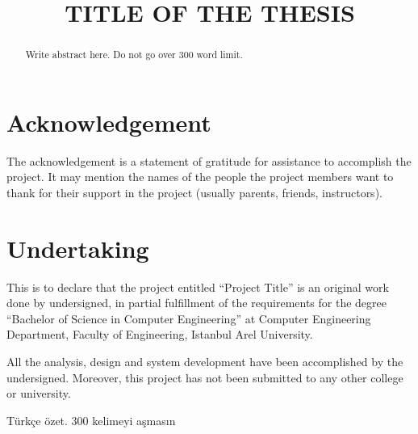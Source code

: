 \documentclass[12pt]{report}
\title{TITLE OF THE THESIS}
\begin{document}
\maketitle


\begin{preliminary}
	
	\chapter*{Acknowledgement}

	The acknowledgement is a statement of gratitude for assistance to accomplish the project. It may mention the names of the people the project members want to thank for their support in the project (usually parents, friends, instructors).


	\chapter*{Undertaking}
	This is to declare that the project entitled “Project Title” is an original work done by undersigned, in partial fulfillment of the requirements for the degree “Bachelor of Science in Computer Engineering” at Computer Engineering Department, Faculty of Engineering, Istanbul Arel University.

	
	All the analysis, design and system development have been accomplished by the undersigned. Moreover, this project has not been submitted to any other college or university.
	
	
\newpage
\begin{abstract}
	Write abstract here. Do not go over 300 word limit.
\end{abstract}


\begin{ozet}
	Türkçe özet. 300 kelimeyi aşmasın
\end{ozet}

\tableofcontents

\listoffigures
{}%

\listoftables
{}%

\end{preliminary}
\end{document}
